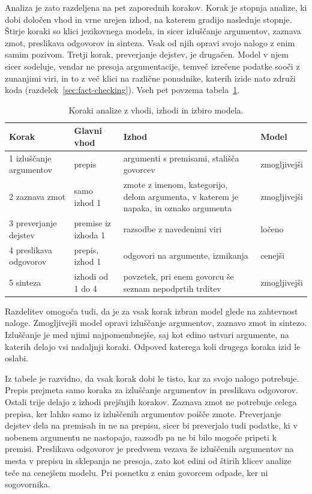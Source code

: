 \documentclass[a4paper, 12pt]{book}
\begin{document}
Analiza je zato razdeljena na pet zaporednih korakov. Korak je stopnja analize,
ki dobi določen vhod in vrne urejen izhod, na katerem gradijo naslednje stopnje.
Štirje koraki so klici jezikovnega modela, in sicer izluščanje argumentov,
zaznava zmot, preslikava odgovorov in sinteza. Vsak od njih opravi svojo nalogo
z enim samim pozivom. Tretji korak, preverjanje dejstev, je drugačen. Model v njem
sicer sodeluje, vendar ne presoja argumentacije, temveč izrečene podatke sooči z
zunanjimi viri, in to z več klici na različne ponudnike, katerih izide nato
združi koda (razdelek~\ref{sec:fact-checking}). Vseh pet povzema
tabela~\ref{tbl:koraki}.

\begin{table}[htbp]
\centering
\small
{}
\begin{tabular}{@{}p{}p{}p{}l@{}}
\toprule
Korak & Glavni vhod & Izhod & Model \\
\midrule
1 izluščanje argumentov & prepis & argumenti s premisami, stališča govorcev & zmogljivejši \\
\midrule
2 zaznava zmot & samo izhod 1 & zmote z imenom, kategorijo, delom argumenta, v katerem je napaka, in oznako argumenta & zmogljivejši \\
\midrule
3 preverjanje dejstev & premise iz izhoda 1 & razsodbe z navedenimi viri & ločeno \\
\midrule
4 preslikava odgovorov & prepis, izhod 1 & odgovori na argumente, izmikanja & cenejši \\
\midrule
5 sinteza & izhodi od 1 do 4 & povzetek, pri enem govorcu še seznam nepodprtih trditev & zmogljivejši \\
\bottomrule
\end{tabular}
\caption{Koraki analize z vhodi, izhodi in izbiro modela.}
\label{tbl:koraki}
\end{table}

Razdelitev omogoča tudi, da je za vsak korak izbran model glede na zahtevnost
naloge. Zmogljivejši model opravi izluščanje argumentov, zaznavo zmot in
sintezo. Izluščanje je med njimi najpomembnejše, saj kot edino ustvari
argumente, na katerih delajo vsi nadaljnji koraki. Odpoved katerega koli drugega
koraka izid le oslabi. 

Iz tabele je razvidno, da vsak korak dobi le tisto, kar za svojo nalogo
potrebuje. Prepis prejmeta samo koraka za izluščanje argumentov in preslikava odgovorov. Ostali trije delajo z izhodi prejšnjih korakov. 
Zaznava zmot ne potrebuje celega prepisa, ker lahko samo iz izluščenih argumentov poišče zmote.
Preverjanje dejstev dela na premisah in ne na prepisu, sicer bi preverjalo tudi podatke, ki v nobenem argumentu ne nastopajo, razsodb pa ne bi bilo mogoče pripeti k premisi.
Preslikava odgovorov je predvsem vezava že izluščenih argumentov na mesta v prepisu in sklepanja ne presoja, zato kot edini od štirih klicev analize teče na cenejšem modelu. Pri posnetku z enim govorcem odpade, ker ni sogovornika.
\end{document}
